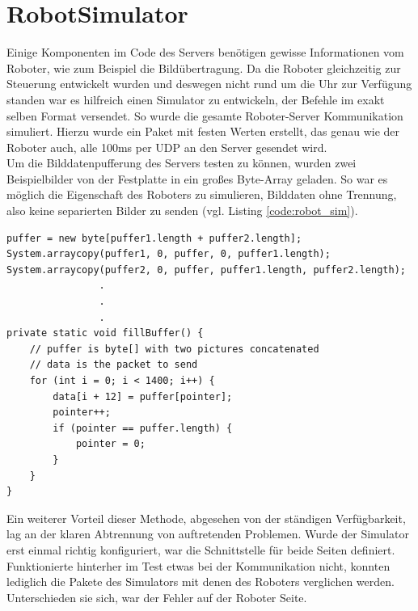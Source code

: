 \section{RobotSimulator}
Einige Komponenten im Code des Servers benötigen gewisse Informationen vom Roboter, wie zum Beispiel die Bildübertragung. Da die Roboter gleichzeitig zur Steuerung entwickelt wurden und deswegen nicht rund um die Uhr zur Verfügung standen war es hilfreich einen Simulator zu entwickeln, der Befehle im exakt selben Format versendet. So wurde die gesamte Roboter-Server Kommunikation simuliert. Hierzu wurde ein Paket mit festen Werten erstellt, das genau wie der Roboter auch, alle 100ms per UDP an den Server gesendet wird.\\
Um die Bilddatenpufferung des Servers testen zu können, wurden zwei Beispielbilder von der Festplatte in ein großes Byte-Array geladen. So war es möglich die Eigenschaft des Roboters zu simulieren, Bilddaten ohne Trennung, also keine separierten Bilder zu senden (vgl. Listing \ref{code:robot_sim}). \\

\begin{lstlisting}[captionpos = b, caption=Quellcode des RobotSimulators zum Testen der Kameraübertragung, label = code:robot_sim]
puffer = new byte[puffer1.length + puffer2.length];
System.arraycopy(puffer1, 0, puffer, 0, puffer1.length);
System.arraycopy(puffer2, 0, puffer, puffer1.length, puffer2.length);
				.
				.
				.
private static void fillBuffer() {
	// puffer is byte[] with two pictures concatenated
	// data is the packet to send
	for (int i = 0; i < 1400; i++) {
		data[i + 12] = puffer[pointer];
		pointer++;
		if (pointer == puffer.length) {
			pointer = 0;
		}
	}
}
\end{lstlisting}

Ein weiterer Vorteil dieser Methode, abgesehen von der ständigen Verfügbarkeit, lag an der klaren Abtrennung von auftretenden Problemen. Wurde der Simulator erst einmal richtig konfiguriert, war die Schnittstelle für beide Seiten definiert. Funktionierte hinterher im Test etwas bei der Kommunikation nicht, konnten lediglich die Pakete des Simulators mit denen des Roboters verglichen werden. Unterschieden sie sich, war der Fehler auf der Roboter Seite.